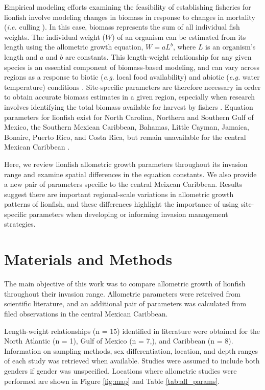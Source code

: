 \documentclass[fleqn,10pt,lineno]{wlpeerj} %
\begin{document}
Empirical modeling efforts examining the feasibility of establishing
fisheries for lionfish involve modeling changes in biomass in response
to changes in mortality (\emph{i.e.} culling
\citep{cote_2014,barbour_2011,andradibrown_2017}). In this case, biomass
represents the sum of all individual fish weights. The individual weight
(\(W\)) of an organism can be estimated from its length using the
allometric growth equation, \(W = aL^b\), where \(L\) is an organism's
length and \(a\) and \(b\) are constants. This length-weight
relationship for any given species is an essential component of
biomass-based modeling, and can vary across regions as a response to
biotic (\emph{e.g.} local food availability) and abiotic (\emph{e.g.}
water temperature) conditions \citep{johnson_2016}. Site-specific
parameters are therefore necessary in order to obtain accurate biomass
estimates in a given region, especially when research involves
identifying the total biomass available for harvest by fishers
\citep{barbour_2011,morris_2011,johnston_2015,chin_2016}. Equation
parameters for lionfish exist for North Carolina, Northern and Southern
Gulf of Mexico, the Southern Mexican Caribbean, Bahamas, Little Cayman,
Jamaica, Bonaire, Puerto Rico, and Costa Rica, but remain unavailable
for the central Mexican Caribbean
\citep{barbour_2011,fogg_2013,dahl_2014,aguilarperera_2016,sabidoitza_2016,darling_2011,edwards_2014,chin_2016,deleon_2013,toledohernndez_2014,sandel_2015}.

Here, we review lionfish allometric growth parameters throughout its
invasion range and examine spatial differences in the equation
constants. We also provide a new pair of parameters specific to the
central Meixcan Caribbean. Results suggest there are important
regional-scale variations in allometric growth patterns of lionfish, and
these differences highlight the importance of using site-specific
parameters when developing or informing invasion management strategies.

\section*{Materials and Methods}

The main objective of this work was to compare allometric growth of
lionfish throughout their invasion range. Allometric parameters were
retreived from scientific literature, and an additional pair of
parameters was calculated from filed observations in the central Mexican
Caribbean.

Length-weight relationships (n = 15) identified in literature were
obtained for the North Atlantic (n = 1), Gulf of Mexico (n = 7,), and
Caribbean (n = 8). Information on sampling methods, sex differentiation,
location, and depth ranges of each study was retrieved when available.
Studies were assumed to include both genders if gender was unspecified.
Locations where allometric studies were performed are shown in Figure
\ref{fig:map} and Table \ref{tab:all_params}.
\end{document}
